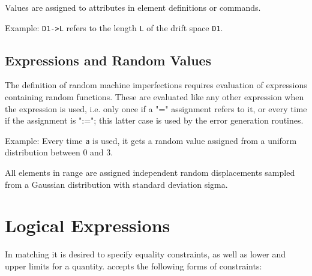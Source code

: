Values are assigned to attributes in element definitions or commands. 

Example: 
\texttt{D1-\textgreater L} refers to the length \texttt{L} of the drift
space \texttt{D1}.   

\subsection{Expressions and Random Values}
\label{subsec:expr_rnd}
The definition of random machine imperfections requires evaluation of
expressions containing random functions. These are evaluated like any
other expression when the expression is used, i.e. only once if a "="
assignment refers to it, or every time if the assignment is ":="; this
latter case is used by the error generation routines.  

Example: 
Every time \texttt{a} is used, it gets a random value assigned from a uniform
distribution between 0 and 3.  

All elements in range are assigned independent random displacements
sampled from a Gaussian distribution with standard deviation sigma.  



%
\section{Logical Expressions}
\label{sec:logicalexpr}

In matching it is desired to specify equality constraints, as well as
lower and upper limits for a quantity. \madx accepts the following forms
of constraints:  





